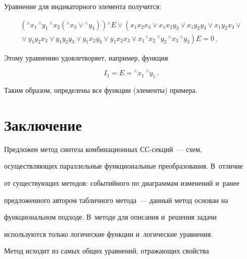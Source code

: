    


   Уравнение для индикаторного элемента получится:


   \begin{multline*}


   \left({^\wedge x_1}\,{^\wedge y_1}\,{^\wedge x_2} \left(


   {^\wedge x_3} \vee {^\wedge y_3}\right) 


\right) {^\wedge E} \vee \left(x_1 x_2 x_3 \vee x_1 x_2 y_3 \vee x_1 y_2 y_3 \vee


 x_1 y_2 x_3 \vee {}\right.\\


 \left.{}\vee y_1 


y_2 x_3 \vee y_1 y_2 y_3 \vee y_1 x_2 y_3 \vee y_1 x_2 x_3 \vee x_1 {^\wedge x_2}\,


{^\wedge  y_2}\, {^\wedge x_3}\,{^\wedge y_3}\right) E = 0\,.


   \end{multline*}


   Этому уравнению удовлетворяет, например, функция


   $$


   I_1 = E = {^\wedge x_1}\,{^\wedge y_1}\,.


   $$


   


   Таким образом, определены все функции (элементы) примера.





\section{Заключение}


   Предложен метод синтеза комбинационных СС-секций~--- схем, 


осуществляющих параллельные функциональные преобразования. В~отличие 


от существующих методов: событийного по диаграммам изменений и~ранее 


предложенного автором табличного метода~--- данный метод основан на 


функциональном подходе. В~методе для описания и~решения задачи 


используются только логические функции и~логические уравнения.


   


   Метод исходит из самых общих уравнений, отражающих свойства 


